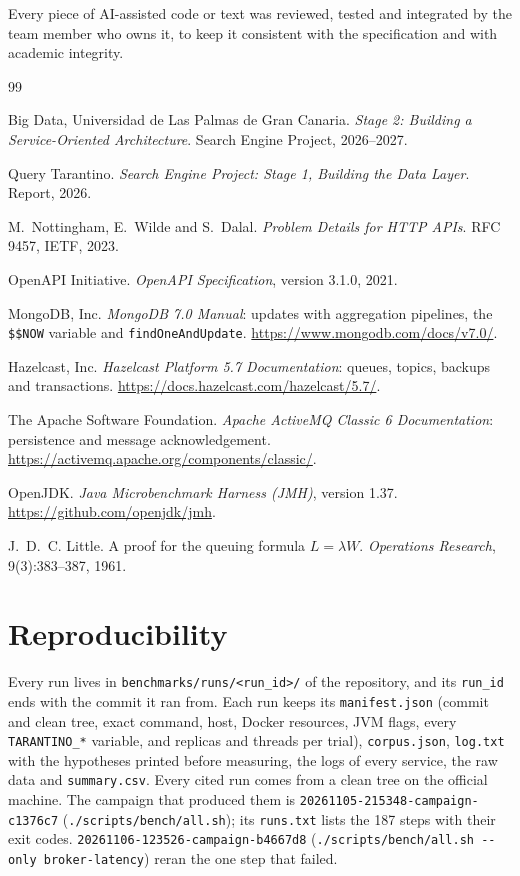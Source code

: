 \documentclass[11pt,a4paper]{article}
\newcommand{\code}[1]{\nolinkurl{#1}}
\newcommand{\run}[1]{\nolinkurl{#1}}
\begin{document}
Every piece of AI-assisted code or text was reviewed, tested and integrated by the team member who owns it, to keep
it consistent with the specification and with academic integrity.
\begin{thebibliography}{99}

Big Data, Universidad de Las Palmas de Gran Canaria.
\newblock \emph{Stage 2: Building a Service-Oriented Architecture}. Search Engine Project, 2026--2027.

Query Tarantino.
\newblock \emph{Search Engine Project: Stage 1, Building the Data Layer}. Report, 2026.

M.~Nottingham, E.~Wilde and S.~Dalal.
\newblock \emph{Problem Details for HTTP APIs}. RFC 9457, IETF, 2023.

OpenAPI Initiative.
\newblock \emph{OpenAPI Specification}, version 3.1.0, 2021.

MongoDB, Inc.
\newblock \emph{MongoDB 7.0 Manual}: updates with aggregation pipelines, the \code{$$NOW} variable and \code{findOneAndUpdate}.
\newblock \url{https://www.mongodb.com/docs/v7.0/}.

Hazelcast, Inc.
\newblock \emph{Hazelcast Platform 5.7 Documentation}: queues, topics, backups and transactions.
\newblock \url{https://docs.hazelcast.com/hazelcast/5.7/}.

The Apache Software Foundation.
\newblock \emph{Apache ActiveMQ Classic 6 Documentation}: persistence and message acknowledgement.
\newblock \url{https://activemq.apache.org/components/classic/}.

OpenJDK.
\newblock \emph{Java Microbenchmark Harness (JMH)}, version 1.37.
\newblock \url{https://github.com/openjdk/jmh}.

J.~D.~C. Little.
\newblock A proof for the queuing formula $L = \lambda W$.
\newblock \emph{Operations Research}, 9(3):383--387, 1961.

\end{thebibliography}

\appendix
\clearpage
\section{Reproducibility}
\label{app:runs}

Every run lives in \code{benchmarks/runs/<run_id>/} of the repository, and its \code{run_id} ends with the commit it
ran from. Each run keeps its \code{manifest.json} (commit and clean tree, exact command, host, Docker resources, JVM
flags, every \code{TARANTINO_*} variable, and replicas and threads per trial), \code{corpus.json}, \code{log.txt} with
the hypotheses printed before measuring, the logs of every service, the raw data and \code{summary.csv}. Every cited
run comes from a clean tree on the official machine. The campaign that produced them is
\run{20261105-215348-campaign-c1376c7} (\code{./scripts/bench/all.sh}); its \code{runs.txt} lists the 187 steps with
their exit codes. \run{20261106-123526-campaign-b4667d8} (\code{./scripts/bench/all.sh --only broker-latency}) reran the
one step that failed.
\end{document}
